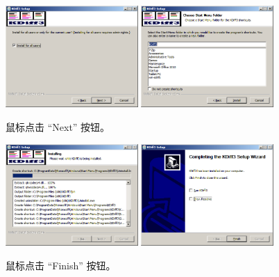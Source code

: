 \documentclass{article}
\begin{document}
\begin{figure}[ht]\centering
  \includegraphics[width=0.45\textwidth]{figures/git/set8-5.png}
  \includegraphics[width=0.45\textwidth]{figures/git/set8-6.png}
  \caption{鼠标点击 ``Next'' 按钮。}\label{fig:set8-5}
\end{figure}

\begin{figure}[ht]\centering
  \includegraphics[width=0.45\textwidth]{figures/git/set8-7.png}
  \includegraphics[width=0.45\textwidth]{figures/git/set8-8.png}
  \caption{鼠标点击 ``Finish'' 按钮。}\label{fig:set8-7}
\end{figure}
\end{document}

